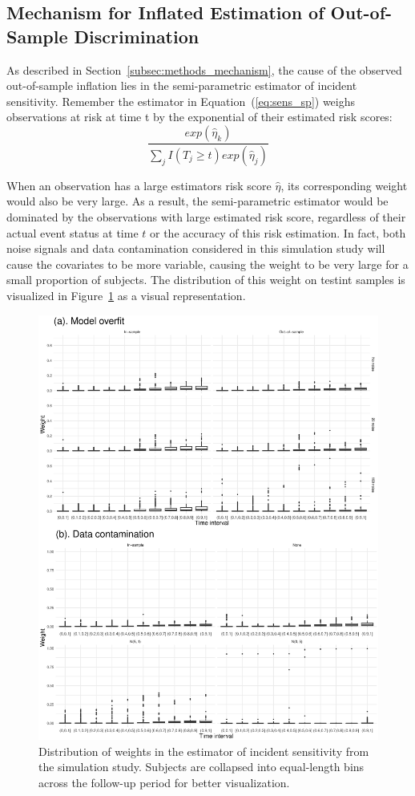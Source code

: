 \documentclass[useAMS,usenatbib, referee]{biom}
\begin{document}
\subsection{Mechanism for Inflated Estimation of Out-of-Sample Discrimination}

As described in Section~\ref{subsec:methods_mechanism}, the cause of the observed out-of-sample inflation lies in the semi-parametric estimator of incident sensitivity. Remember the  estimator in Equation~(\ref{eq:sens_sp}) weighs observations at risk at time t by the exponential of their estimated risk scores: 
\[
    \frac{exp(\hat{\eta}_k)}{\sum_{j}I(T_j\geq t)exp(\hat{\eta}_j)}
\]
 

When an observation has a large estimators risk score $\hat{\eta}$, its corresponding weight would also be very large. As a result, the semi-parametric estimator would be dominated by the observations with large estimated risk score, regardless of their actual event status at time $t$ or the accuracy of this risk estimation. In fact, both noise signals and data contamination considered in this simulation study will cause the covariates to be more variable, causing the weight to be very large for a small proportion of subjects. The distribution of this weight on testint samples is visualized in Figure~\ref{fig:np_sens_wt} as a visual representation.

\begin{figure}
    \centerline{\includegraphics[width=
    \textwidth]{sens_wt.eps}}
    \caption{Distribution of weights in the estimator of incident sensitivity from the simulation study. Subjects are collapsed into equal-length bins across the follow-up period for better visualization.}
    \label{fig:np_sens_wt}
\end{figure}
\end{document}
